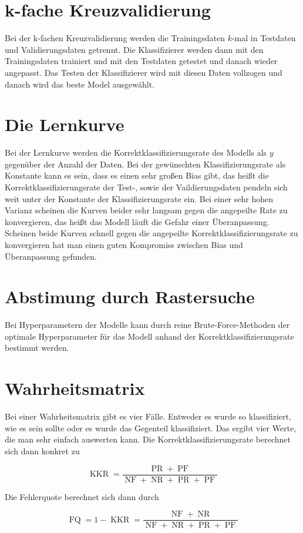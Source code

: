 \documentclass[11pt]{article} %
\DeclareMathOperator{\KKR}{KKR}
\DeclareMathOperator{\PR}{PR}
\DeclareMathOperator{\PF}{PF}
\DeclareMathOperator{\NF}{NF}
\DeclareMathOperator{\NR}{NR}
\DeclareMathOperator{\FQ}{FQ}
\begin{document}
\section{k-fache Kreuzvalidierung}
Bei der k-fachen Kreuzvalidierung werden die Trainingsdaten $k$-mal in Testdaten und Validierungsdaten getrennt. Die Klassifizierer werden dann mit den 
Trainingsdaten trainiert und mit den Testdaten getestet und danach wieder angepasst.  Das Testen der Klassifizierer wird mit diesen Daten vollzogen und 
danach wird das beste Model ausgewählt.
\section{Die Lernkurve}
Bei der Lernkurve werden die Korrektklassifizierungsrate des Modells als $y$ gegenüber der Anzahl der Daten. Bei der gewünschten Klassifizierungsrate als 
Konstante kann es sein, dass es einen sehr großen Bias gibt, das heißt die Korrektklassifizierungsrate der Test-, sowie der Vaildierungsdaten pendeln sich weit
unter der Konstante der Klassifizierungsrate ein. Bei einer sehr hohen Varianz scheinen die Kurven beider sehr langsam gegen die angepeilte Rate zu konvergieren,
das heißt das Modell läuft die Gefahr einer Überanpassung. Scheinen beide Kurven schnell gegen die angepeilte Korrektklassifizierungsrate zu konvergieren hat
man einen guten Kompromiss zwischen Bias und Überanpassung gefunden.
\section{Abstimung durch Rastersuche}
Bei Hyperparametern der Modelle kann durch reine Brute-Force-Methoden der optimale Hyperparameter für das Modell anhand der Korrektklassifizierungsrate bestimmt werden.
\section{Wahrheitsmatrix}
Bei einer Wahrheitsmatrix gibt es vier Fälle. Entweder es wurde so klassifiziert, wie es sein sollte oder es wurde das Gegenteil klassifiziert. Das ergibt vier Werte, die man sehr einfach auswerten kann. 
Die Korrektklassifizierungsrate berechnet sich dann konkret zu

\begin{equation}
\KKR = \frac{\PR+\PF}{\NF+\NR+\PR+\PF}
\end{equation}

Die Fehlerquote berechnet sich dann durch

\begin{equation}
\FQ = 1-\KKR = \frac{\NF+\NR}{\NF+\NR+\PR+\PF}
\end{equation}
\end{document}
